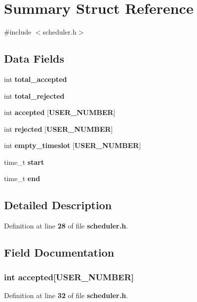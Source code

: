 \section{Summary Struct Reference}
\label{struct_summary}


{\ttfamily \#include $<$scheduler.\+h$>$}

\subsection*{Data Fields}
\begin{DoxyCompactItemize}
\item 
int {\bf total\+\_\+accepted}
\item 
int {\bf total\+\_\+rejected}
\item 
int {\bf accepted} [{\bf U\+S\+E\+R\+\_\+\+N\+U\+M\+B\+E\+R}]
\item 
int {\bf rejected} [{\bf U\+S\+E\+R\+\_\+\+N\+U\+M\+B\+E\+R}]
\item 
int {\bf empty\+\_\+timeslot} [{\bf U\+S\+E\+R\+\_\+\+N\+U\+M\+B\+E\+R}]
\item 
time\+\_\+t {\bf start}
\item 
time\+\_\+t {\bf end}
\end{DoxyCompactItemize}


\subsection{Detailed Description}


Definition at line {\bf 28} of file {\bf scheduler.\+h}.



\subsection{Field Documentation}
\subsubsection[{accepted}]{\setlength{\rightskip}{0pt plus 5cm}int accepted[{\bf U\+S\+E\+R\+\_\+\+N\+U\+M\+B\+E\+R}]}\label{struct_summary_a1132c4543b61ad455280a61b02d44962}


Definition at line {\bf 32} of file {\bf scheduler.\+h}.

